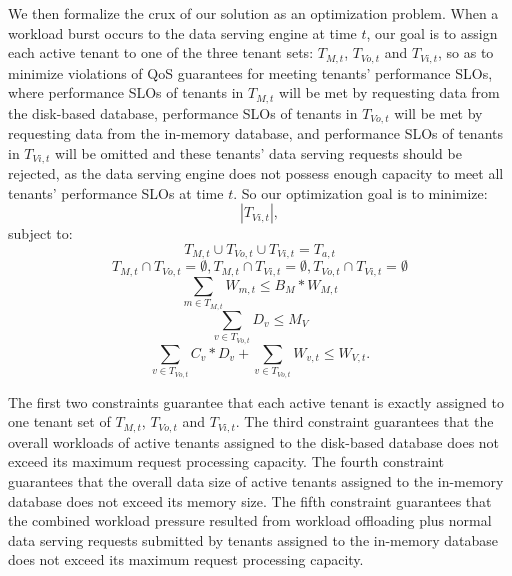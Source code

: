 We then formalize the crux of our solution as an optimization problem. When a workload burst occurs to the data serving engine at time $t$, our goal is to assign each active tenant to one of the three tenant sets: $T_{M, t}$, $T_{Vo, t}$ and $T_{Vi, t}$, so as to minimize violations of QoS guarantees for meeting tenants' performance SLOs, where performance SLOs of tenants in $T_{M, t}$ will be met by requesting data from the disk-based database, performance SLOs of tenants in $T_{Vo, t}$ will be met by requesting data from the in-memory database, and performance SLOs of tenants in $T_{Vi, t}$ will be omitted and these tenants' data serving requests should be rejected, as the data serving engine does not possess enough capacity to meet all tenants' performance SLOs at time $t$. So our optimization goal is to minimize:
\begin{equation}\label{objectivefunction}
 |T_{Vi ,t}|,
\end{equation}
subject to:
\begin{equation}\label{constraint1}
T_{M, t} \cup T_{Vo, t} \cup T_{Vi, t} = T_{a, t}
\end{equation}
\begin{equation}\label{constraint2}
T_{M, t} \cap T_{Vo, t} = \emptyset, T_{M, t} \cap T_{Vi, t} = \emptyset, T_{Vo, t} \cap T_{Vi, t} = \emptyset
\end{equation}
\begin{equation}\label{constraint3}
\sum_{m \in T_{M, t}}{W_{m, t}} \leq B_M * W_{M, t}
\end{equation}
\begin{equation}\label{constraint4}
\sum_{v \in T_{Vo, t}}{D_v} \leq M_V
\end{equation}
\begin{equation}\label{constraint5}
\sum_{v \in T_{Vo, t}}{C_v * D_v} + \sum_{v \in T_{Vo, t}}{W_{v, t}} \leq W_{V, t}.
\end{equation}

The first two constraints guarantee that each active tenant is exactly assigned to one tenant set of $T_{M, t}$, $T_{Vo, t}$ and $T_{Vi, t}$. The third constraint guarantees that the overall workloads of active tenants assigned to the disk-based database does not exceed its maximum request processing capacity. The fourth constraint guarantees that the overall data size of active tenants assigned to the in-memory database does not exceed its memory size. The fifth constraint guarantees that the combined workload pressure resulted from workload offloading plus normal data serving requests submitted by tenants assigned to the in-memory database does not exceed its maximum request processing capacity.

